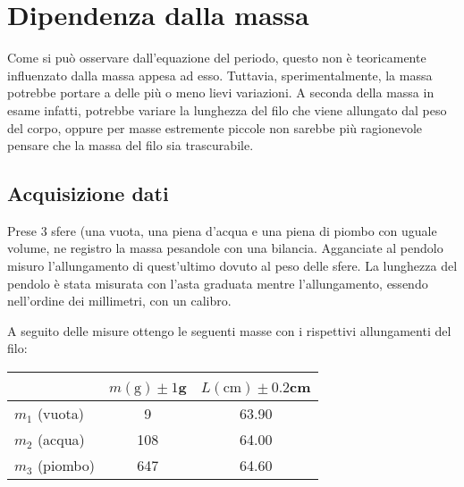 \documentclass{article}
\begin{document}
	
	
	
	
	
	
	\section{Dipendenza dalla massa}
	Come si può osservare dall'equazione del periodo, questo non è teoricamente influenzato dalla massa appesa ad esso. Tuttavia, sperimentalmente, la massa potrebbe portare a delle più o meno lievi variazioni. A seconda della massa in esame infatti, potrebbe variare la lunghezza del filo che viene allungato dal peso del corpo, oppure per masse estremente piccole non sarebbe più ragionevole pensare che la massa del filo sia trascurabile.
	
	
	
	\subsection{Acquisizione dati}
	Prese 3 sfere (una vuota, una piena d'acqua e una piena di piombo con uguale volume, ne registro la massa pesandole con una bilancia. Agganciate al pendolo misuro l'allungamento di quest'ultimo dovuto al peso delle sfere. La lunghezza del pendolo è stata misurata con l'asta graduata mentre l'allungamento, essendo nell'ordine dei millimetri, con un calibro. 
	
	A seguito delle misure ottengo le seguenti masse con i rispettivi allungamenti del filo:
	
	\vspace{0.5cm}
	\begin{table}[H]
		\centering
		\begin{tabular}{@{}lcc@{}}
				& \multicolumn{1}{l}{$m(\text{g}) \pm 1$g} & \multicolumn{1}{l}{$L(\text{cm}) \pm 0.2$cm}  \\ \midrule
			$m_1$ (vuota)   & 9& 63.90                                            \\
			$m_2$ (acqua)  & 108 & 64.00                                          \\
			$m_3$ (piombo)  & 647  & 64.60                                        \\ \bottomrule
		\end{tabular}
	\end{table}
	\vspace{0.5cm}
	
\end{document}
